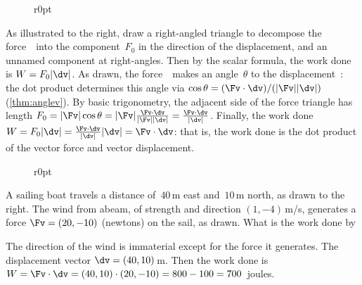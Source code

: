 \begin{wrapfigure}[4]r{0pt}\end{wrapfigure}
As illustrated to the right, draw a right-angled triangle to decompose the force~\Fv\ into the component~\(F_0\) in the direction of the displacement, and an unnamed component at right-angles.
Then by the scalar formula, the work done is \(W=F_0|\dv|\).
As drawn, the force~\Fv\ makes an angle~\(\theta\) to the displacement~\dv: the dot product determines this angle via \(\cos\theta=(\Fv\cdot\dv)/(|\Fv||\dv|)\)  (\cref{thm:anglev}).
By basic trigonometry, the adjacent side of the force triangle has length \(F_0=|\Fv|\cos\theta=|\Fv|\frac{\Fv\cdot\dv}{|\Fv||\dv|}=\frac{\Fv\cdot\dv}{|\dv|}\).
Finally, the work done \(W=F_0|\dv|=\frac{\Fv\cdot\dv}{|\dv|}|\dv|=\Fv\cdot\dv\): that is, the work done is the dot product of the vector force and vector displacement.
\par
\endgroup


\begin{wrapfigure}[6]r{0pt}
\end{wrapfigure}
\begin{example} 
A sailing boat travels a distance of~\(40\)\,m east and~\(10\)\,m north, as drawn to the right.
The wind from abeam, of strength and direction \((1,-4)\)\,m/s, generates a force \(\Fv=(20,-10)\) (newtons) on the sail, as drawn.
What is the work done by 

\begin{solution} 
The direction of the wind is immaterial except for the force it generates.
The displacement vector \(\dv=(40,10)\)\,m.
Then the work done is \(W=\Fv\cdot\dv =(40,10)\cdot(20,-10) =800-100 =700\)~joules. 
\end{solution}
\end{example}



